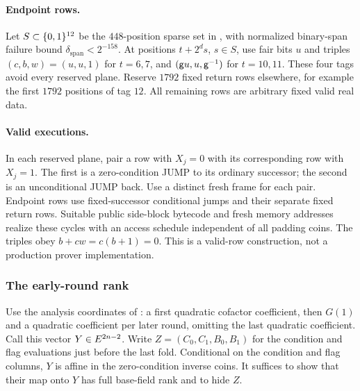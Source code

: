 \paragraph{Endpoint rows.} Let $S\subset\{0,1\}^{12}$ be the $448$-position sparse set in , with normalized binary-span failure bound $\delta_{\mathrm{span}}<2^{-158}$. At positions $t+2^d s$, $s\in S$, use fair bits $u$ and triples $(c,b,w)=(u,u,1)$ for $t=6,7$, and $(\mathsf{g} u,u,\mathsf{g}^{-1})$ for $t=10,11$. These four tags avoid every reserved plane. Reserve $1792$ fixed return rows elsewhere, for example the first $1792$ positions of tag $12$. All remaining rows are arbitrary fixed valid real data.

\paragraph{Valid executions.} In each reserved plane, pair a row with $X_j=0$ with its corresponding row with $X_j=1$. The first is a zero-condition JUMP to its ordinary successor; the second is an unconditional JUMP back. Use a distinct fresh frame for each pair. Endpoint rows use fixed-successor conditional jumps and their separate fixed return rows. Suitable public side-block bytecode and fresh memory addresses realize these cycles with an access schedule independent of all padding coins. The triples obey $b+cw=c(b+1)=0$. This is a valid-row construction, not a production prover implementation.

\subsubsection{The early-round rank}

Use the analysis coordinates of : a first quadratic cofactor coefficient, then $G(1)$ and a quadratic coefficient per later round, omitting the last quadratic coefficient. Call this vector $Y\in E^{2n-2}$. Write $Z=(C_0,C_1,B_0,B_1)$ for the condition and flag evaluations just before the last fold. Conditional on the condition and flag columns, $Y$ is affine in the zero-condition inverse coins. It suffices to show that their map onto $Y$ has full base-field rank and to hide $Z$.


